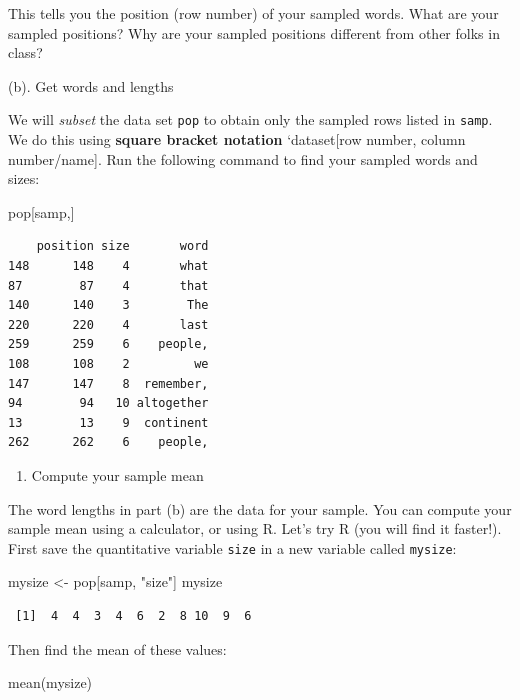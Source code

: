 \documentclass[
]{book}
\newenvironment{Shaded}{\begin{snugshade}}{\end{snugshade}}
\newcommand{\FunctionTok}[1]{\textcolor[rgb]{0.00,0.00,0.00}{#1}}
\newcommand{\NormalTok}[1]{#1}
\newcommand{\OtherTok}[1]{\textcolor[rgb]{0.56,0.35,0.01}{#1}}
\newcommand{\StringTok}[1]{\textcolor[rgb]{0.31,0.60,0.02}{#1}}
\providecommand{\tightlist}{%
  \setlength{\itemsep}{0pt}\setlength{\parskip}{0pt}}
\begin{document}
This tells you the position (row number) of your sampled words. What are your sampled positions? Why are your sampled positions different from other folks in class?

(b). Get words and lengths

We will \emph{subset} the data set \texttt{pop} to obtain only the sampled rows listed in \texttt{samp}. We do this using \textbf{square bracket notation} `dataset{[}row number, column number/name{]}. Run the following command to find your sampled words and sizes:

\begin{Shaded}
\begin{Highlighting}[]
\NormalTok{pop[samp,]}
\end{Highlighting}
\end{Shaded}

\begin{verbatim}
    position size       word
148      148    4       what
87        87    4       that
140      140    3        The
220      220    4       last
259      259    6    people,
108      108    2         we
147      147    8  remember,
94        94   10 altogether
13        13    9  continent
262      262    6    people,
\end{verbatim}

\begin{enumerate}
\def\labelenumi{\alph{enumi}.}
\setcounter{enumi}{2}
\tightlist
\item
  Compute your sample mean
\end{enumerate}

The word lengths in part (b) are the data for your sample. You can compute your sample mean using a calculator, or using R. Let's try R (you will find it faster!). First save the quantitative variable \texttt{size} in a new variable called \texttt{mysize}:

\begin{Shaded}
\begin{Highlighting}[]
\NormalTok{mysize }\OtherTok{\textless{}{-}}\NormalTok{ pop[samp, }\StringTok{"size"}\NormalTok{]}
\NormalTok{mysize}
\end{Highlighting}
\end{Shaded}

\begin{verbatim}
 [1]  4  4  3  4  6  2  8 10  9  6
\end{verbatim}

Then find the mean of these values:

\begin{Shaded}
\begin{Highlighting}[]
\FunctionTok{mean}\NormalTok{(mysize)}
\end{Highlighting}
\end{Shaded}
\end{document}
